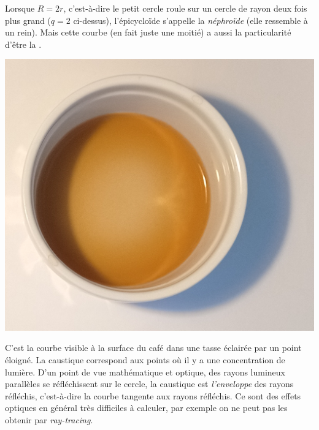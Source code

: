 \documentclass[11pt,class=report,crop=false]{standalone}
\begin{document}
\begin{exemple}
Lorsque $R=2r$, c'est-à-dire le petit cercle roule sur un cercle de rayon deux fois plus grand ($q=2$ ci-dessus), l'épicycloïde s'appelle la \emph{néphroïde} (elle ressemble à un rein). Mais cette courbe (en fait juste une moitié) a aussi la particularité d'être la . 

\begin{center}
\begin{minipage}{0.45\textwidth}  
	\includegraphics[scale=\myscale,scale=0.17]{figures/caustique}	
\end{minipage}	
\begin{minipage}{0.45\textwidth}  
\end{minipage}
\end{center}

C'est la courbe visible à la surface du café dans une tasse éclairée par un point éloigné. La caustique correspond aux points où il y a une concentration de lumière. D'un point de vue mathématique et optique, des rayons lumineux parallèles se réfléchissent sur le cercle, la caustique est \emph{l'enveloppe} des rayons réfléchis, c'est-à-dire la courbe tangente aux rayons réfléchis. Ce sont des effets optiques en général très difficiles à calculer, par exemple on ne peut pas les obtenir par \emph{ray-tracing}.




\end{exemple}
\end{document}
